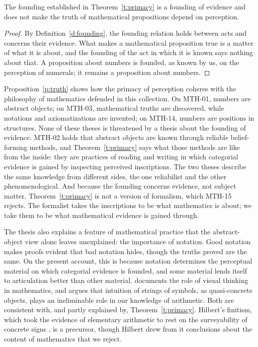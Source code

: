\documentclass{situationist-preprint}
\begin{document}
\begin{proposition}\label{p:truth}
The founding established in Theorem~\ref{t:primacy} is a founding of evidence and does not make the truth of mathematical propositions depend on perception.
\end{proposition}

\begin{proof}
By Definition~\ref{d:founding}, the founding relation holds between acts and concerns their evidence. What makes a mathematical proposition true is a matter of what it is about, and the founding of the act in which it is known says nothing about that. A proposition about numbers is founded, as known by us, on the perception of numerals; it remains a proposition about numbers.
\end{proof}

Proposition~\ref{p:truth} shows how the primacy of perception coheres with the philosophy of mathematics defended in this collection. On MTH-01, numbers are abstract objects; on MTH-03, mathematical truths are discovered, while notations and axiomatizations are invented; on MTH-14, numbers are positions in structures. None of these theses is threatened by a thesis about the founding of evidence. MTH-02 holds that abstract objects are known through reliable belief-forming methods, and Theorem~\ref{t:primacy} says what those methods are like from the inside: they are practices of reading and writing in which categorial evidence is gained by inspecting perceived inscriptions. The two theses describe the same knowledge from different sides, the one reliabilist and the other phenomenological. And because the founding concerns evidence, not subject matter, Theorem~\ref{t:primacy} is not a version of formalism, which MTH-15 rejects. The formalist takes the inscriptions to be what mathematics is about; we take them to be what mathematical evidence is gained through.

The thesis also explains a feature of mathematical practice that the abstract-object view alone leaves unexplained: the importance of notation. Good notation makes proofs evident that bad notation hides, though the truths proved are the same. On the present account, this is because notation determines the perceptual material on which categorial evidence is founded, and some material lends itself to articulation better than other material. \citet{Giaquinto2007} documents the role of visual thinking in mathematics, and \citet{Parsons2008} argues that intuition of strings of symbols, as quasi-concrete objects, plays an ineliminable role in our knowledge of arithmetic. Both are consistent with, and partly explained by, Theorem~\ref{t:primacy}. Hilbert's finitism, which took the evidence of elementary arithmetic to rest on the surveyability of concrete signs \citep{Hilbert1926}, is a precursor, though Hilbert drew from it conclusions about the content of mathematics that we reject.
\end{document}

